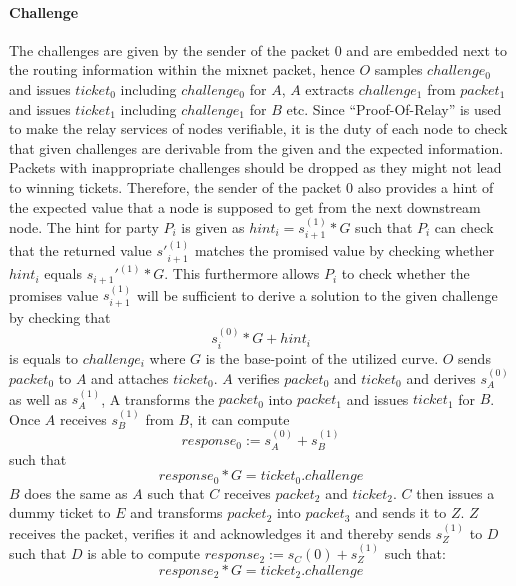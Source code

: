 \paragraph{Challenge}
The challenges are given by the sender of the packet $0$ and are embedded next to the routing information within the mixnet packet, hence $O$ samples $challenge_0$ and issues $ticket_0$ including $challenge_0$ for $A$, $A$ extracts $challenge_1$ from $packet_1$ and issues $ticket_1$ including $challenge_1$ for $B$ etc.
\newline Since “Proof-Of-Relay” is used to make the relay services of nodes verifiable, it is the duty of each node to check that given challenges are derivable from the given and the expected information. 
Packets with inappropriate challenges should be dropped as they might not lead to winning tickets.
\newline Therefore, the sender of the packet $0$ also provides a hint of the expected value that a node is supposed to get from the next downstream node. The hint for party $P_i$ is given as $hint_i=s_{i+1}^{(1)}*G$ such that $P_i$ can check that the returned value $s'^{(1)}_{i+1}$ matches the promised value by checking whether $hint_i$ equals $s_{i+1}'^{(1)}*G$. 
This furthermore allows $P_i$ to check whether the promises value $s_{i+1}^{(1)}$ will be sufficient to derive a solution to the given challenge by checking that $$s_i^{(0)}*G+hint_i$$ is equals to $challenge_i$ where $G$ is the base-point of the utilized curve.
\newline $O$ sends $packet_0$ to $A$ and attaches $ticket_0$. $A$ verifies $packet_0$ and $ticket_0$ and derives $s_A^{(0)}$ as well as $s_A^{(1)}$, A transforms the $packet_0$ into $packet_1$ and issues $ticket_1$ for $B$. Once $A$ receives $s_B^{(1)}$ from $B$, it can compute $$response_0:=s_A^{(0)}+s_B^{(1)}$$ such that $$response_0*G=ticket_0.challenge$$ $B$ does the same as $A$ such that $C$ receives $packet_2$ and $ticket_2$. $C$ then issues a dummy ticket to $E$ and transforms $packet_2$ into $packet_3$ and sends it to $Z$. $Z$ receives the packet, verifies it and acknowledges it and thereby sends $s_Z^{(1)}$ to $D$ such that $D$ is able to compute $response_2:=s_C{(0)}+s_Z^{(1)}$ such that: $$response_2*G=ticket_2.challenge$$



